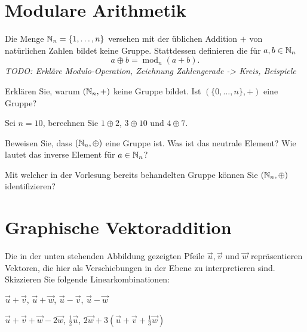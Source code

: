 \documentclass{scrartcl}
\renewcommand{\mod}{\operatorname{mod}}
\newcommand{\uu}{\vec{u}}
\newcommand{\vv}{\vec{v}}
\newcommand{\ww}{\vec{w}}
\begin{document}
\section{Modulare Arithmetik}
Die Menge $\mathbb{N}_n = \{1,\ldots,n\}$ versehen mit der üblichen Addition $+$ von natürlichen Zahlen bildet keine Gruppe.
Stattdessen definieren die  für $a, b \in \mathbb{N}_n$
\[
a \oplus b = \mod_n(a + b).
\]
\emph{TODO: Erkläre Modulo-Operation, Zeichnung Zahlengerade -> Kreis, Beispiele}
\begin{subex}
  \item Erklären Sie, warum $(\mathbb{N}_n, +)$ keine Gruppe bildet.
  Ist $(\{0, \ldots, n\},+)$ eine Gruppe?
  \item Sei $n=10$, berechnen Sie $1 \oplus 2$, $3 \oplus 10$ und $4 \oplus 7$.
  \item Beweisen Sie, dass $(\mathbb{N}_n,\oplus)$ eine Gruppe ist.
  Was ist das neutrale Element?
  Wie lautet das inverse Element für $a\in\mathbb{N}_n$?
  \item Mit welcher in der Vorlesung bereits behandelten Gruppe können Sie $(\mathbb{N}_n,\oplus)$ identifizieren?
\end{subex}


\section{Graphische Vektoraddition}
Die in der unten stehenden Abbildung gezeigten Pfeile $\uu, \vv$ und $\ww$ repräsentieren Vektoren, die hier als Verschiebungen in der Ebene zu interpretieren sind.
Skizzieren Sie folgende Linearkombinationen:
\begin{subex}
  \item $\uu + \vv$, $\uu + \ww$, $\uu - \vv$, $\uu - \ww$
  \item $\uu + \vv + \ww -2\ww$, $\frac{1}{2}\uu$, $2\ww + 3(\uu + \vv + \frac{1}{3}\ww)$
\end{subex}
\begin{center}
\end{center}
\end{document}
